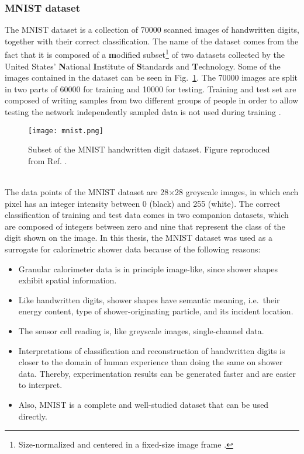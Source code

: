 \documentclass[../../main.tex]{subfiles}
\begin{document}
\subsubsection{MNIST dataset}\label{sec:mnist}
The MNIST dataset is a collection of \SI{70000}{} scanned images of handwritten digits, together with their correct classification. The name of the dataset comes from the fact that it is composed of a \textbf{m}odified subset\footnote{Size-normalized and centered in a fixed-size image frame \cite{lecun_mnist}.} of two datasets collected by the United States' \textbf{N}ational \textbf{I}nstitute of \textbf{S}tandards and \textbf{T}echnology. Some of the images contained in the dataset can be seen in Fig.~\ref{fig:mnist}. The \SI{70000}{} images are split in two parts of \SI{60000}{} for training and \SI{10000}{} for testing. Training and test set are composed of writing samples from two different groups of people in order to allow testing the network independently sampled data is not used during training \cite{nielsen15}.\\
\begin{figure}[htp]
	\begin{center}
		\texttt{[image: mnist.png]}
		\caption{Subset of the MNIST handwritten digit dataset. Figure reproduced from Ref. \cite{wiki_mnist}.}
		\label{fig:mnist}
	\end{center}
\end{figure}
\\
The data points of the MNIST dataset are 28$\times$28 greyscale images, in which each pixel has an integer intensity between 0 (black) and 255 (white). The correct classification of training and test data comes in two companion datasets, which are composed of integers between zero and nine that represent the class of the digit shown on the image. In this thesis, the MNIST dataset was used as a surrogate for calorimetric shower data because of the following reasons:
\begin{itemize}
	\item Granular calorimeter data is in principle image-like, since shower shapes exhibit spatial information.
	\item Like handwritten digits, shower shapes have semantic meaning, i.e.~their energy content, type of shower-originating particle, and its incident location. 
	\item The sensor cell reading is, like greyscale images, single-channel data.
	\item Interpretations of classification and reconstruction of handwritten digits is closer to the domain of human experience than doing the same on shower data. Thereby, experimentation results can be generated faster and are easier to interpret.
	\item Also, MNIST is a complete and well-studied dataset that can be used directly.
\end{itemize}
\end{document}
